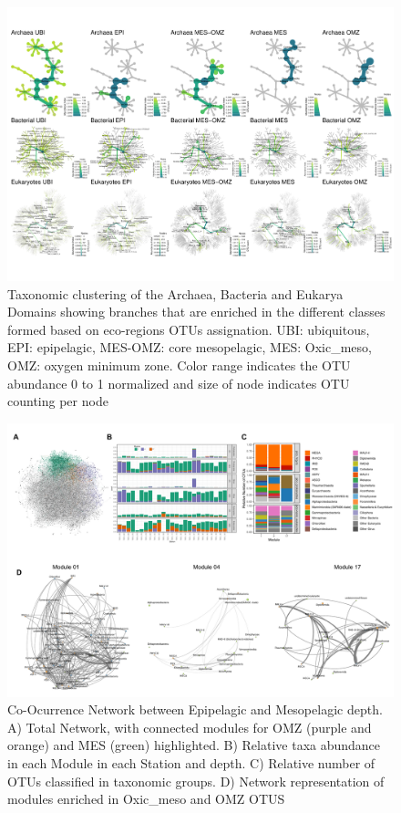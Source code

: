 \documentclass[fleqn,10pt]{wlscirep}
\begin{document}
\begin{figure}[ht]
    \centering
    \includegraphics[scale=0.7,angle=90,origin=c]{images/hmap_general_pub.pdf}
    \caption{Taxonomic clustering of the Archaea, Bacteria and Eukarya Domains showing branches that are enriched in the different classes formed based on eco-regions OTUs assignation. UBI: ubiquitous, EPI: epipelagic, MES-OMZ: core mesopelagic, MES: Oxic\_meso, OMZ: oxygen minimum zone. Color range indicates the OTU abundance 0 to 1 normalized and size of node indicates OTU counting per node}
    \label{fig:tax_trees}
\end{figure}
\clearpage
\begin{figure}[ht]
    \centering
    \includegraphics[scale=0.5]{images/Networks_Composite_v3.pdf}
    \caption{Co-Ocurrence Network between Epipelagic and Mesopelagic depth. A) Total Network, with connected modules for OMZ (purple and orange) and MES (green) highlighted. B) Relative taxa abundance in each Module in each Station and depth. C) Relative number of OTUs classified in taxonomic groups. D) Network representation of modules enriched in Oxic\_meso and OMZ OTUS}
    \label{fig:networks}
\end{figure}
\clearpage
\end{document}
